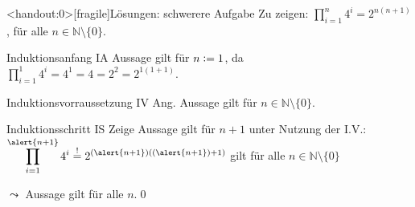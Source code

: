 {\begin{frame}<handout:0>[fragile]{Lösungen: schwerere Aufgabe}
     Zu zeigen: $\displaystyle\prod_{i=1}^{n} 4^i = 2^{n(n+1)}$, für alle $n \in \mathbb{N}\setminus \{0\}$.
    \begin{alertblock}{Induktionsanfang IA}
        Aussage gilt für $n\vcentcolon= 1$, da $\displaystyle\prod_{i=1}^{1} 4^i = 4^1 = 4 = 2^2 = 2^{1(1+1)}$.
    \end{alertblock}
    \begin{alertblock}{Induktionsvorraussetzung IV}
        Ang. Aussage gilt für $n \in\mathbb{N}\setminus \{0\}$.
    \end{alertblock}
    \begin{alertblock}{Induktionsschritt IS}
        Zeige Aussage gilt für $n+1$ unter Nutzung der I.V.:\\
        $\displaystyle\prod_{i=1}^{\alert{n+1}} 4^i \overset{!}{=} 2^{(\alert{n+1})((\alert{n+1})+1)}$ gilt für alle $n \in \mathbb{N}\setminus \{0\}$
    \end{alertblock}
    \alert{$\leadsto$ Aussage gilt für alle $n$.}\qed
\end{frame}
}

